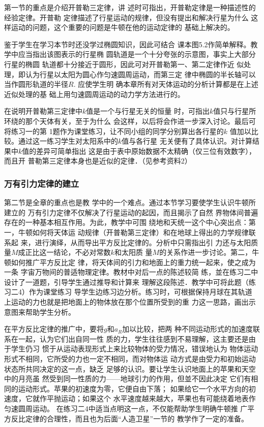 第一节的重点是介绍开普勒三定律，讲
述时可指出，开普勒定律是一种描述性的经验定律。开普勒
定律描述了行星运动的规律，但没有提出和解决行星为什么
这样运动的问题，这个重要的问题是牛顿在他的运动定律的
基础上解决的。

鉴于学生在学习本节时还没学过椭圆知识，因此可结合
课本图5.2作简单解释。教学中应当指出该图表示的行星椭
圆轨道是一个十分夸张的示意图，事实上大部分行星的椭圆
轨道都十分接近于圆形，因此可对开普勒第一、第二定律作近
似处理，即认为行星以太阳为圆心作匀速圆周运动，而第三定
律中椭圆的半长轴可以当作圆形轨道的半径$R$. 应使学生明
确本章所有对天体运动的分析计算都是在上述近似处理的基
础上用匀速圆周运动的动力学方法进行的。

在说明开普勒第三定律中$k$值是一个与行星无关的恒量
时，可指出$k$值只与行星所环绕的那个天体有关，至于为什么
会这样，以后将会作进一步深入讨论。最后可将练习一的第
1题作为课堂练习，让不同小组的同学分别算出各行星的$k$
值加以比较。通过这一练习学生对太阳系中的$k$值与各行星
无关便有了具体认识。对计算结果中$k$值的差异可简单指出
这是由于表中原始数据不太精确（仅三位有效数字），而且开
普勒第三定律本身也是近似的定律．（见参考资料2）

\subsubsection{万有引力定律的建立}

第二节是全章的重点也是教
学中的一个难点。通过本节学习要使学生认识牛顿所建立的
万有引力定律不仅解决了行星运动的起因，而且揭示了自然
界物体间普遍存在的一种基本相互作用。为此，教学中可围
绕地和天统一这个中心突出点：第一，牛顿如何将天体运
动规律（开普勒第三定律）和在地球上得出的力学规律联系起
来，进行演绎，从而导出平方反比定律的。分析中只需指出引
力还与太阳质量$M$成正比这一结论，不必对常数$k$和太阳质
量$M$的关系作进一步讨论。第二，牛顿如何推广平方反比定
律，将天体间的引力和地面上的重力统一起来，使之成为一条
字宙万物间的普适物理定律。教材中对后一点的陈述较简
练，並在练习二中设计了一道题，引导学生通过推导和计算来
理解这段陈述．教学中可将此题（练习二4）作为课堂练习
导学生边练习边分析。练习时，可根据保持月球在其轨道
上运动的力也就是把地面上的物体放在那个位置所受到的重
力这一思路，画出示意图来帮助学生分析。

在平方反比定律的推广中，要将$g$和$a_R$加以比较，把两
种不同运动形式的加速度联系在一起，认为它们出自同一性
质的力，学生往往感到不易理解，这主要还是由于学生仍习
惯于从运动表现形式上来比较物体的受力情况，错误地认为
物体运动形式不相同，它所受的力也一定不相同，而对物体运
动方式是由受力和初始运动状态所共同决定的这一点，缺乏
足够的认识。要让学生认识地面上的苹果和天空中的月亮虽
然受到同一性质的力——地球引力的作用，但並不因此决定
它们有相同的运动形式。苹果的初速度为零，它便自由下落；
如果给它一个水平方向的初速度，它就作平抛运动；如果这个
水平速度越来越大，苹果也有可能绕着地表作匀速圆周运动。
在练习二4中适当点明这一点，不仅能帮助学生明确牛顿推
广平方反比定律的合理性，而且也为后面“人造卫星”一节的
教学作了一定的准备。

